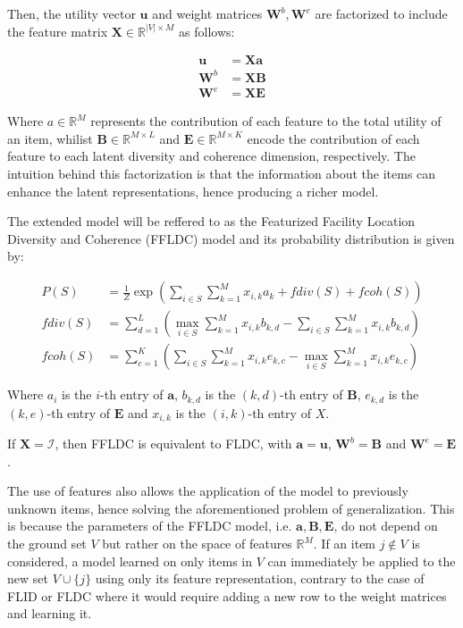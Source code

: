 Then, the utility vector $\mathbf{u}$ and weight matrices $\mathbf{W}^{b}, \mathbf{W}^{e}$ are factorized to include the feature matrix $\mathbf{X} \in \mathbb{R}^{|V| \times M}$ as follows:

\begin{align}
  \mathbf{u} &= \mathbf{Xa}   \label{eq:ffldc-factorization-1} \\
  \mathbf{W}^{b} &= \mathbf{XB}  \label{eq:ffldc-factorization-2} \\
  \mathbf{W}^{e} &= \mathbf{XE}
  \label{eq:ffldc-factorization-3}
\end{align} 

Where $a \in \mathbb{R}^{M}$ represents the contribution of each feature to the total utility of an item, whilist $\mathbf{B} \in \mathbb{R}^{M \times L}$ and $\mathbf{E} \in \mathbb{R}^{M \times K}$ encode the contribution of each feature to each latent diversity and coherence dimension, respectively. The intuition behind this factorization is that the information about the items can enhance the latent representations, hence producing a richer model.

The extended model will be reffered to as the Featurized Facility Location Diversity and Coherence (FFLDC) model and its probability distribution is given by:

\begin{align}
  \tag{FFLDC} \label{eq:ffldc}
  P(S) &= \frac{1}{Z}\exp{\left(\sum_{i \in S}{\sum_{k=1}^{M}x_{i,k}a_{k}} + fdiv(S) + fcoh(S)\right)} \\
  fdiv(S) &= \sum_{d=1}^{L}{\left(\max_{i \in S}{\sum_{k=1}^{M}x_{i,k}b_{k,d}} - \sum_{i \in S}{\sum_{k=1}^{M}x_{i,k}b_{k,d}}\right)} \\
  fcoh(S) &= \sum_{c=1}^{K}{\left(\sum_{i \in S}{\sum_{k=1}^{M}x_{i,k}e_{k,c}} - \max_{i \in S}{\sum_{k=1}^{M}x_{i,k}e_{k,c}}\right)}
\end{align}

Where $a_{i}$ is the $i$-th entry of $\mathbf{a}$, $b_{k,d}$ is the $(k,d)$-th entry of $\mathbf{B}$, $e_{k,d}$ is the $(k,e)$-th entry of $\mathbf{E}$ and $x_{i,k}$ is the $(i,k)$-th entry of $X$.

\begin{remark}
  If $\mathbf{X} = \mathcal{I}$, then FFLDC is equivalent to FLDC, with $\mathbf{a} = \mathbf{u}$, $\mathbf{W}^{b} = \mathbf{B}$ and $\mathbf{W}^{e} = \mathbf{E}$.
\end{remark}

The use of features also allows the application of the model to previously unknown items, hence solving the aforementioned problem of generalization. This is because the parameters of the FFLDC model, i.e. $\mathbf{a}, \mathbf{B}, \mathbf{E}$, do not depend on the ground set $V$ but rather on the space of features $\mathbb{R}^{M}$. If an item $j \notin V$ is considered, a model learned on only items in $V$ can immediately be applied to the new set $V \cup \{j\}$ using only its feature representation, contrary to the case of FLID or FLDC where it would require adding a new row to the weight matrices and learning it.

